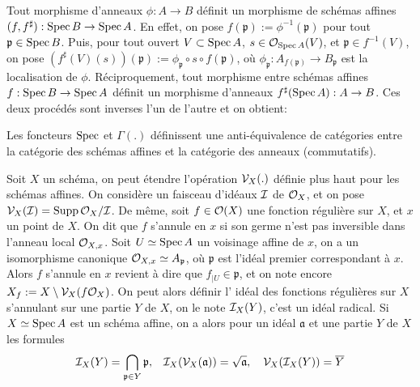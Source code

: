 Tout morphisme d'anneaux $\phi:A\rightarrow B$ définit un morphisme de schémas affines $(f,f^\sharp):\operatorname{Spec} B\rightarrow\operatorname{Spec} A$. En effet, on pose $f(\mathfrak{p}):=\phi^{-1}(\mathfrak{p})$ pour tout $\mathfrak{p}\in \operatorname{Spec} B$. Puis, pour tout ouvert $V\subset \operatorname{Spec} A$, $s\in\mathcal{O}_{\operatorname{Spec} A}(V)$, et $\mathfrak{p}\in f^{-1}(V)$, on pose $(f^\sharp(V)(s))(\mathfrak{p}):=\phi_{\mathfrak{p}}\circ s \circ f(\mathfrak{p})$, où $\phi_{\mathfrak{p}}:A_{f(\mathfrak{p})}\rightarrow B_{\mathfrak{p}}$ est la localisation de $\phi$.
Réciproquement, tout morphisme entre schémas affines $f:\operatorname{Spec} B\rightarrow \operatorname{Spec} A$ définit un morphisme d'anneaux $f^\sharp(\operatorname{Spec} A):A\rightarrow B$. Ces deux procédés sont inverses l'un de l'autre et on obtient:


\begin{prop}\label{EqCat}
Les foncteurs $\operatorname{Spec}$ et $\Gamma(.)$ définissent une anti-équivalence de catégories entre la catégorie des schémas affines et la catégorie des anneaux (commutatifs).
\end{prop}

Soit $X$ un schéma, on peut étendre l'opération $\mathcal{V}_X(.)$ définie plus haut pour les schémas affines. On considère un faisceau d'idéaux $\mathcal{I}$ de $\mathcal{O}_X$, et on pose $\mathcal{V}_X(\mathcal{I})=\operatorname{Supp} \mathcal{O}_X/\mathcal{I}$. De même, soit $f\in \mathcal{O}(X)$ une fonction régulière sur $X$, et $x$ un point de $X$. On dit que $f$ s'annule en $x$ si son germe n'est pas inversible dans l'anneau local $\mathcal{O}_{X,x}$. Soit $U\simeq\operatorname{Spec} A$ un voisinage affine de $x$, on a un isomorphisme canonique $\mathcal{O}_{X,x}\simeq A_\mathfrak{p}$, où $\mathfrak{p}$ est l'idéal premier correspondant à $x$. Alors $f$ s'annule en $x$ revient à dire que $f_{|U}\in \mathfrak{p}$, et on note encore $X_f:=X\setminus \mathcal{V}_X(f\mathcal{O}_X)$. On peut alors définir l' idéal des fonctions régulières sur $X$ s'annulant sur une partie $Y$ de $X$, on le note $\mathcal{I}_X(Y)$, c'est un idéal radical. Si $X\simeq\operatorname{Spec} A$ est un schéma affine, on a alors pour un idéal $\mathfrak{a}$ et une partie $Y$ de $X$ les formules
$$\mathcal{I}_X(Y)=\bigcap_{\mathfrak{p}\in Y}\mathfrak{p},\,\,\,\,\, \mathcal{I}_X(\mathcal{V}_X(\mathfrak{a}))=\sqrt{\mathfrak{a}},\,\,\,\,\,\,\mathcal{V}_X(\mathcal{I}_X(Y))=\overline{Y}$$


